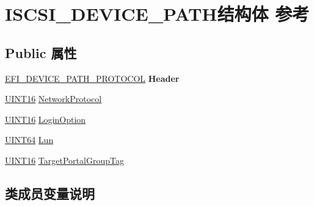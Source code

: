 \hypertarget{struct_i_s_c_s_i___d_e_v_i_c_e___p_a_t_h}{}\section{I\+S\+C\+S\+I\+\_\+\+D\+E\+V\+I\+C\+E\+\_\+\+P\+A\+T\+H结构体 参考}
\label{struct_i_s_c_s_i___d_e_v_i_c_e___p_a_t_h}
\subsection*{Public 属性}
\begin{DoxyCompactItemize}
\item 
\mbox{\label{struct_i_s_c_s_i___d_e_v_i_c_e___p_a_t_h_a9ec977cce621def3079398606b6c1440}} 
\hyperlink{struct_e_f_i___d_e_v_i_c_e___p_a_t_h___p_r_o_t_o_c_o_l}{E\+F\+I\+\_\+\+D\+E\+V\+I\+C\+E\+\_\+\+P\+A\+T\+H\+\_\+\+P\+R\+O\+T\+O\+C\+OL} {\bfseries Header}
\item 
\hyperlink{_processor_bind_8h_a09f1a1fb2293e33483cc8d44aefb1eb1}{U\+I\+N\+T16} \hyperlink{struct_i_s_c_s_i___d_e_v_i_c_e___p_a_t_h_a92934e6eddfedd8637281c8847c69c3c}{Network\+Protocol}
\item 
\hyperlink{_processor_bind_8h_a09f1a1fb2293e33483cc8d44aefb1eb1}{U\+I\+N\+T16} \hyperlink{struct_i_s_c_s_i___d_e_v_i_c_e___p_a_t_h_a7954d80a8442567b33519b162306fb18}{Login\+Option}
\item 
\hyperlink{_processor_bind_8h_a57be03562867144161c1bfee95ca8f7c}{U\+I\+N\+T64} \hyperlink{struct_i_s_c_s_i___d_e_v_i_c_e___p_a_t_h_a1fe40edbd53ee63897966889f9063b35}{Lun}
\item 
\hyperlink{_processor_bind_8h_a09f1a1fb2293e33483cc8d44aefb1eb1}{U\+I\+N\+T16} \hyperlink{struct_i_s_c_s_i___d_e_v_i_c_e___p_a_t_h_a4533813c521f0d3df4af19d6ddd98deb}{Target\+Portal\+Group\+Tag}
\end{DoxyCompactItemize}


\subsection{类成员变量说明}
\mbox{\label{struct_i_s_c_s_i___d_e_v_i_c_e___p_a_t_h_a7954d80a8442567b33519b162306fb18}} 
